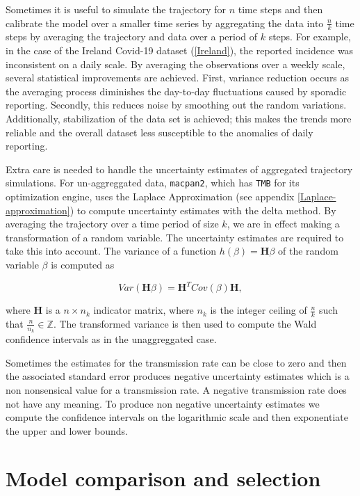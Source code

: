 \documentclass[
11pt, %
oneside, %
english, %
singlespacing, %
]{macthesis} %
\begin{document}
Sometimes it is useful to simulate the trajectory for \(n\) time steps and then calibrate the model over a smaller time series by aggregating the data into \(\frac{n}{k}\) time steps by averaging the trajectory and data over a period of \(k\) steps. For example, in the case of the Ireland Covid-19 dataset (\ref{Ireland}), the reported incidence was inconsistent on a daily scale. By averaging the observations over a weekly scale, several statistical improvements are achieved. First, variance reduction occurs as the averaging process diminishes the day-to-day fluctuations caused by sporadic reporting. Secondly, this reduces noise by smoothing out the random variations. Additionally, stabilization of the data set is achieved; this makes the trends more reliable and the overall dataset less susceptible to the anomalies of daily reporting.

Extra care is needed to handle the uncertainty estimates of aggregated trajectory simulations. For un-aggreggated data, \texttt{macpan2}, which has \texttt{TMB} for its optimization engine, uses the Laplace Approximation (see appendix \ref{Laplace-approximation}) to compute uncertainty estimates with the delta method. By averaging the trajectory over a time period of size \(k\), we are in effect making a transformation of a random variable. The uncertainty estimates are required to take this into account. The variance of a function \(h(\beta) = \mathbf{H} \beta\) of the random variable \(\beta\) is computed as

\[
Var(\mathbf{H} \beta) = \mathbf{H}^T Cov(\beta) \mathbf{H},
\]

where \(\mathbf{H}\) is a \(n \times n_k\) indicator matrix, where \(n_k\) is the integer ceiling of \(\frac{n}{k}\) such that \(\frac{n}{n_k} \in \mathbb{Z}\). The transformed variance is then used to compute the Wald confidence intervals as in the unaggreggated case.

Sometimes the estimates for the transmission rate can be close to zero and then the associated standard error produces negative uncertainty estimates which is a non nonsensical value for a transmission rate. A negative transmission rate does not have any meaning. To produce non negative uncertainty estimates we compute the confidence intervals on the logarithmic scale and then exponentiate the upper and lower bounds.

\section{Model comparison and selection}\label{Model-comparison-and-selection}
\end{document}
